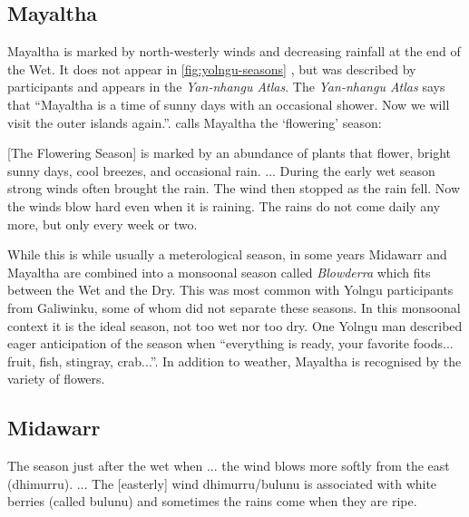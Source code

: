 \subsection{Mayaltha}

Mayaltha is marked by north-westerly winds and decreasing rainfall at the
end of the Wet.  It does not appear in \cref{fig:yolngu-seasons} \citep{davis1989},
but was described by participants and appears in the \textit{Yan-nhangu Atlas}.
%
The \textit{Yan-nhangu Atlas} says that ``Mayaltha is a time of sunny days
with an occasional shower.  Now we will visit the outer islands again.''.
\citet{davis1989} calls Mayaltha the `flowering' season:
\begin{bquote}{\citet{davis1989}}
    [The Flowering Season] is marked by an abundance of plants that
    flower, bright sunny days, cool breezes, and occasional rain. ...
    During the early wet season strong winds often brought the rain.
    The wind then stopped as the rain fell.  Now the winds blow hard
    even when it is raining.  The rains do not come daily any more,
    but only every week or two.
\end{bquote}

While this is while usually a meterological season, in some years Midawarr
and Mayaltha are combined into a monsoonal season called \textit{Blowderra}
which fits between the Wet and the Dry.  This was most common with Yolngu
participants from Galiwinku, some of whom did not separate these seasons.
%
In this monsoonal context it is the ideal season, not too wet nor too dry.
One Yolngu man described eager anticipation of the season
when ``everything is ready, your favorite foods...  fruit, fish, stingray,
crab...''.  In addition to weather, Mayaltha is recognised by the variety
of flowers.


\subsection{Midawarr}

\begin{bquote}{\citet{barber2005}}
The season just after the wet when ... the wind blows more softly from the east
(dhimurru). ... The [easterly] wind dhimurru/bulunu is associated with white berries
(called bulunu) and sometimes the rains come when they are ripe.
\end{bquote}

